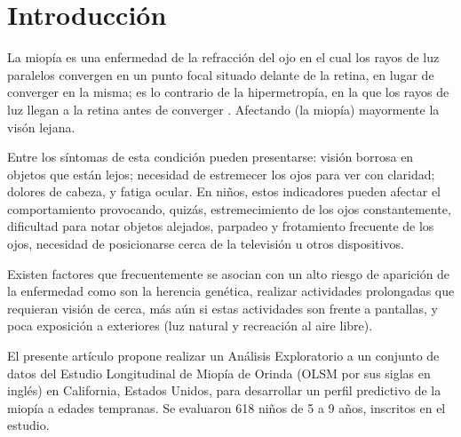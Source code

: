 \documentclass[a4paper,10pt,twocolumn]{article}
\begin{document}

\section{Introducción}\label{sec:intro}
		La miopía es una enfermedad de la refracción del ojo en el cual los rayos de luz paralelos convergen en un punto focal situado delante de la retina, en lugar de converger en la misma; es lo contrario de la hipermetropía, en la que los rayos de luz llegan a la retina antes de converger \cite{semi}. Afectando (la miopía) mayormente la visón lejana.
		
		Entre los síntomas de esta condición pueden presentarse: visión borrosa en objetos que están lejos; necesidad de estremecer los ojos para ver con claridad; dolores de cabeza, y fatiga ocular. En niños, estos indicadores pueden afectar el comportamiento provocando, quizás, estremecimiento de los ojos constantemente, dificultad para notar objetos alejados, parpadeo y frotamiento frecuente de los ojos, necesidad de posicionarse cerca de la televisión u otros dispositivos.

		Existen factores que frecuentemente se asocian con un alto riesgo de aparición de la enfermedad como son la herencia genética, realizar actividades prolongadas que requieran visión de cerca, más aún si estas actividades son frente a pantallas, y poca exposición a exteriores (luz natural y recreación al aire libre).

		El presente artículo propone realizar un Análisis Exploratorio a un conjunto de datos del Estudio Longitudinal de Miopía de Orinda (OLSM por sus siglas en inglés) en California, Estados Unidos, para desarrollar un perfil predictivo de la miopía a edades tempranas. Se evaluaron 618 niños de 5 a 9 años, inscritos en el estudio.



\end{document}
